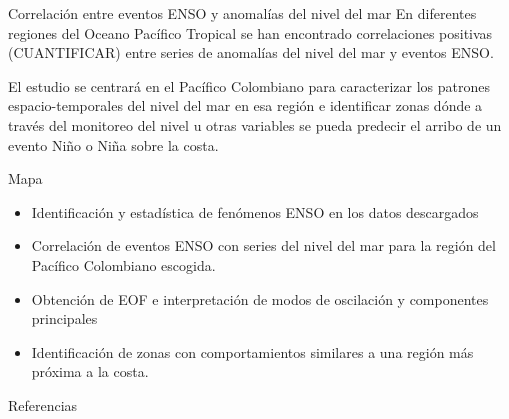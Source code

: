 \documentclass[11pt]{beamer}
\begin{document}
\begin{frame}{Correlación entre eventos ENSO y anomalías del nivel del mar}
En diferentes regiones del Oceano Pacífico Tropical se han encontrado correlaciones positivas (CUANTIFICAR) entre series de anomalías del nivel del mar y eventos ENSO.

El estudio se centrará en el Pacífico Colombiano para caracterizar los patrones espacio-temporales del nivel del mar en esa región e identificar zonas dónde a través del monitoreo del nivel u otras variables se pueda predecir el arribo de un evento Niño o Niña sobre la costa.
\end{frame}

\begin{frame}{Mapa}
	\begin{itemize}
		\item Identificación y estadística de fenómenos ENSO en los datos descargados
		\item Correlación de eventos ENSO con series del nivel del mar para la región del Pacífico Colombiano escogida.
		\item Obtención de EOF e interpretación de modos de oscilación y componentes principales
		\item Identificación de zonas con comportamientos similares a una región más próxima a la costa.
	\end{itemize}
\end{frame}



\begin{frame}{Referencias}


\end{frame}


\begin{frame}
\titlepage 
\end{frame}
\end{document}
